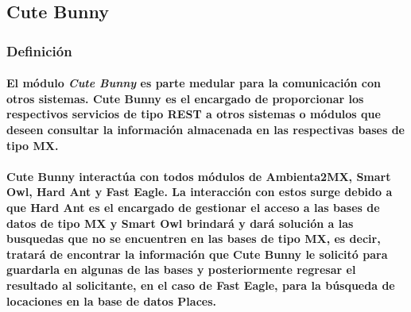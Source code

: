 \subsection{Cute Bunny}
    \subsubsection{Definición}
     \paragraph{El módulo \textbf{\emph{Cute Bunny}} es parte medular para la comunicación con otros sistemas. Cute Bunny es el encargado de proporcionar los respectivos servicios de tipo REST a otros sistemas o módulos que deseen consultar la información almacenada en las respectivas bases de tipo MX.}
  \paragraph{Cute Bunny interactúa con todos módulos de Ambienta2MX, Smart Owl, Hard Ant y Fast Eagle. La interacción con estos surge debido a que Hard Ant es el encargado de gestionar el acceso a las bases de datos de tipo MX y Smart Owl brindará y dará solución a las busquedas que no se encuentren en las bases de tipo MX, es decir, tratará de encontrar la información que Cute Bunny le solicitó para guardarla en algunas de las bases y posteriormente regresar el resultado al solicitante, en el caso de Fast Eagle, para la búsqueda de locaciones en la base de datos Places.}
